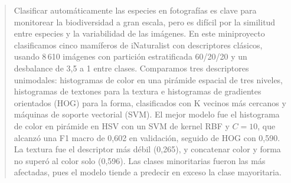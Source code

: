 \begin{abstract}
Clasificar automáticamente las especies en fotografías es clave para monitorear la biodiversidad a gran escala, pero es difícil por la similitud entre especies y la variabilidad de las imágenes. En este miniproyecto clasificamos cinco mamíferos de iNaturalist con descriptores clásicos, usando 8\,610 imágenes con partición estratificada 60/20/20 y un desbalance de 3,5 a 1 entre clases. Comparamos tres descriptores unimodales: histogramas de color en una pirámide espacial de tres niveles, histogramas de textones para la textura e histogramas de gradientes orientados (HOG) para la forma, clasificados con K vecinos más cercanos y máquinas de soporte vectorial (SVM). El mejor modelo fue el histograma de color en pirámide en HSV con un SVM de kernel RBF y $C=10$, que alcanzó una F1 macro de 0,602 en validación, seguido de HOG con 0,590. La textura fue el descriptor más débil (0,265), y concatenar color y forma no superó al color solo (0,596). Las clases minoritarias fueron las más afectadas, pues el modelo tiende a predecir en exceso la clase mayoritaria.
\end{abstract}
